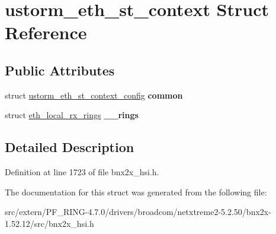 \hypertarget{structustorm__eth__st__context}{
\section{ustorm\_\-eth\_\-st\_\-context Struct Reference}
\label{structustorm__eth__st__context}
}
\subsection*{Public Attributes}
\begin{DoxyCompactItemize}
\item 
\hypertarget{structustorm__eth__st__context_aece610d5c9dd0c5fdea458d9b815ce29}{
struct \hyperlink{structustorm__eth__st__context__config}{ustorm\_\-eth\_\-st\_\-context\_\-config} {\bfseries common}}
\label{structustorm__eth__st__context_aece610d5c9dd0c5fdea458d9b815ce29}

\item 
\hypertarget{structustorm__eth__st__context_a414fa882dd574fe8f00b1245cd94cf6f}{
struct \hyperlink{structeth__local__rx__rings}{eth\_\-local\_\-rx\_\-rings} {\bfseries \_\-\_\-rings}}
\label{structustorm__eth__st__context_a414fa882dd574fe8f00b1245cd94cf6f}

\end{DoxyCompactItemize}


\subsection{Detailed Description}


Definition at line 1723 of file bnx2x\_\-hsi.h.



The documentation for this struct was generated from the following file:\begin{DoxyCompactItemize}
\item 
src/extern/PF\_\-RING-\/4.7.0/drivers/broadcom/netxtreme2-\/5.2.50/bnx2x-\/1.52.12/src/bnx2x\_\-hsi.h\end{DoxyCompactItemize}
